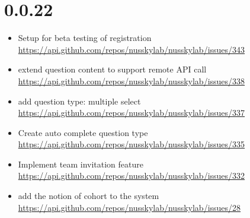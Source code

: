{\section{0.0.22}
\begin{itemize}[noitemsep]
    \item Setup for beta testing of registration \url{https://api.github.com/repos/nusskylab/nusskylab/issues/343} 
    \item extend question content to support remote API call \url{https://api.github.com/repos/nusskylab/nusskylab/issues/338} 
    \item add question type: multiple select \url{https://api.github.com/repos/nusskylab/nusskylab/issues/337} 
    \item Create auto complete question type \url{https://api.github.com/repos/nusskylab/nusskylab/issues/335} 
    \item Implement team invitation feature \url{https://api.github.com/repos/nusskylab/nusskylab/issues/332} 
    \item add the notion of cohort to the system \url{https://api.github.com/repos/nusskylab/nusskylab/issues/28} 
\end{itemize}

}
